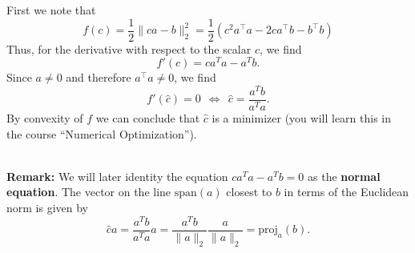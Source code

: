 {
\color{solution}
First we note that
$$f(c)= \frac{1}{2} \|ca - b\|_2^2 =\frac{1}{2} \left(c^2 a^\top a - 2c a^\top b - b^\top b\right)
$$
Thus, for the derivative with respect to the scalar $c$, we find
$$ f'(c) = c a^Ta - a^Tb.$$
Since $a\neq 0$ and therefore $a^\top a \neq 0$, we find 
$$f'(\hat{c}) = 0 ~~\Leftrightarrow~~\hat{c} = \frac{a^Tb}{a^Ta}. $$
By convexity of $f$ we can conclude that $\hat{c}$ is a minimizer (you will learn this in the course ``Numerical Optimization'').

~\\
\textbf{Remark:} We will later identity the equation $c a^Ta - a^Tb=0$ as the \textbf{normal equation}. The vector on the line $\text{span}(a)$ closest to $b$ in terms of the Euclidean norm is given by 
$$\hat{c} a = \frac{a^Tb}{a^Ta} a =\frac{a^Tb}{\|a\|_2}\frac{a}{\|a\|_2} = \text{proj}_a(b). $$
}